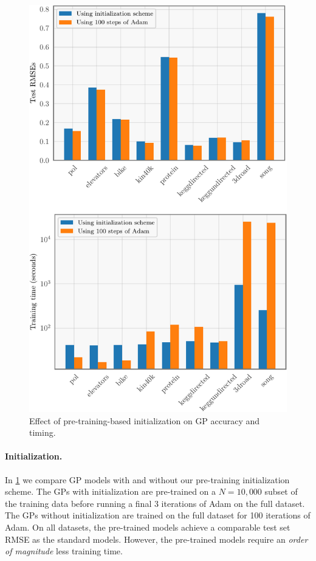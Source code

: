 \begin{figure}[t!]
  \centering
  \includegraphics[width=0.75\linewidth]{figures/initialization.pdf}
  \caption[
    Effect of pre-training-based initialization on GP accuracy and timing.
  ]{
    Effect of pre-training-based initialization on GP accuracy and timing.
  }
  \label{fig:initialization}
\end{figure}

\paragraph{Initialization.}
In \cref{fig:initialization} we compare GP models with and without our pre-training initialization scheme.
The GPs with initialization are pre-trained on a $N=10,\!000$ subset of the training data before running a final $3$ iterations of Adam on the full dataset.
The GPs without initialization are trained on the full dataset for 100 iterations of Adam.
On all datasets, the pre-trained models achieve a comparable test set RMSE as the standard models.
However, the pre-trained models require an \emph{order of magnitude} less training time.
